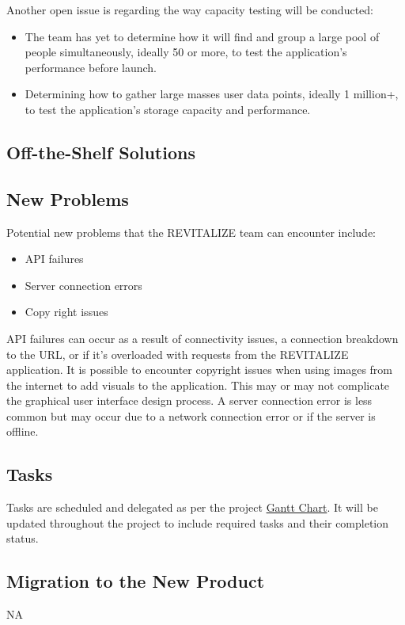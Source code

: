 \documentclass[12pt,letterpaper]{article}
\begin{document}
Another open issue is regarding the way capacity testing will be conducted:
\begin{itemize}
\item The team has yet to determine how it will find and group a large pool of people simultaneously, ideally 50 or more, to test the application's performance before launch.
\item Determining how to gather large masses user data points, ideally 1 million+, to test the application's storage capacity and performance.
\end{itemize}

\subsection{Off-the-Shelf Solutions}


\subsection{New Problems}
Potential new problems that the REVITALIZE team can encounter include:
\begin{itemize}
\item API failures
\item Server connection errors
\item Copy right issues
\end{itemize}
API failures can occur as a result of connectivity issues, a connection breakdown to the URL, or if it's overloaded with requests from the REVITALIZE application. It is possible to encounter copyright issues when using images from the internet to add visuals to the application. This may or may not complicate the graphical user interface design process. A server connection error is less common but may occur due to a network connection error or if the server is offline.

\subsection{Tasks}
Tasks are scheduled and delegated as per the project \href{https://github.com/BillNguyen1999/REVITALIZE/blob/main/projectschedule/REVITALIZE.pdf}{\color{blue}Gantt Chart}. It will be updated throughout the project to include required tasks and their completion status.

\subsection{Migration to the New Product}
NA
\end{document}
